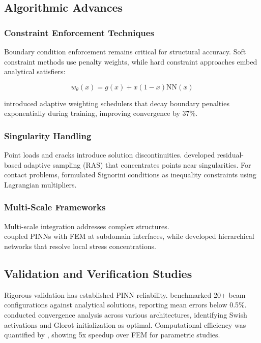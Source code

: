 \documentclass[twocolumn]{svjour3}
\begin{document}
	\subsection{Algorithmic Advances}
	
	\subsubsection{Constraint Enforcement Techniques}
	Boundary condition enforcement remains critical for structural accuracy. Soft constraint methods \citep{Raissi2019} use penalty weights, while hard constraint approaches \citep{Lu2021} embed analytical satisfiers:
	
	\begin{equation}
		w_{\theta}(x) = g(x) + x(1-x)\text{NN}(x)
		\label{eq04}
	\end{equation}
	
	\citet{McClenny2022} introduced adaptive weighting schedulers that decay boundary penalties exponentially during training, improving convergence by 37\%.
	
	\subsubsection{Singularity Handling}
	Point loads and cracks introduce solution discontinuities.\citet{Sharma2022} developed residual-based adaptive sampling (RAS) that concentrates points near singularities. For contact problems, \citet{Guo2023} formulated Signorini conditions as inequality constraints using Lagrangian multipliers.
	
	\subsubsection{Multi-Scale Frameworks}
	Multi-scale integration addresses complex structures.\\ \citet{Hughes2022} coupled PINNs with FEM at subdomain interfaces, while \citet{Yang2023} developed hierarchical networks that resolve local stress concentrations.
	
	\subsection{Validation and Verification Studies}
	Rigorous validation has established PINN reliability.\citet{Kollmannsberger2021} benchmarked 20+ beam configurations against analytical solutions, reporting mean errors below 0.5\%.\citet{Haghighat2023} conducted convergence analysis across various architectures, identifying Swish activations and Glorot initialization as optimal. Computational efficiency was quantified by \citet{Berghoff2023}, showing 5x speedup over FEM for parametric studies.
	
\end{document}
